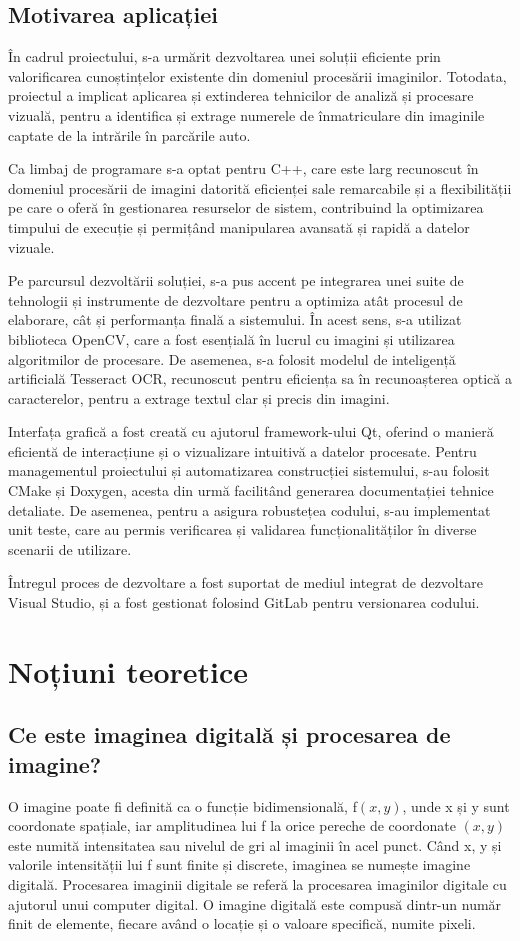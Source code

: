 \documentclass[a4paper,12pt]{report}
\begin{document}
\section{Motivarea aplicației}
În cadrul proiectului, s-a urmărit dezvoltarea unei soluții eficiente prin valorificarea cunoștințelor existente din domeniul procesării imaginilor. Totodata, proiectul a implicat aplicarea și extinderea tehnicilor de analiză și procesare vizuală, pentru a identifica și extrage numerele de înmatriculare din imaginile captate de la intrările în parcările auto.

Ca limbaj de programare s-a optat pentru C++, care este larg recunoscut în domeniul procesării de imagini datorită eficienței sale remarcabile și a flexibilității pe care o oferă în gestionarea resurselor de sistem, contribuind la optimizarea timpului de execuție și permițând manipularea avansată și rapidă a datelor vizuale.

Pe parcursul dezvoltării soluției, s-a pus accent pe integrarea unei suite de tehnologii și instrumente de dezvoltare pentru a optimiza atât procesul de elaborare, cât și performanța finală a sistemului. În acest sens, s-a utilizat biblioteca OpenCV, care a fost esențială în lucrul cu imagini și utilizarea algoritmilor de procesare. De asemenea, s-a folosit modelul de inteligență artificială Tesseract OCR, recunoscut pentru eficiența sa în recunoașterea optică a caracterelor, pentru a extrage textul clar și precis din imagini.

Interfața grafică a fost creată cu ajutorul framework-ului Qt, oferind o manieră eficientă de interacțiune și o vizualizare intuitivă a datelor procesate. Pentru managementul proiectului și automatizarea construcției sistemului, s-au folosit CMake și Doxygen, acesta din urmă facilitând generarea documentației tehnice detaliate. De asemenea, pentru a asigura robustețea codului, s-au implementat unit teste, care au permis verificarea și validarea funcționalităților în diverse scenarii de utilizare.

Întregul proces de dezvoltare a fost suportat de mediul integrat de dezvoltare Visual Studio, și a fost gestionat folosind GitLab pentru versionarea codului.

\chapter{Noțiuni teoretice}
\section{Ce este imaginea digitală și procesarea de imagine?}
O imagine poate fi definită ca o funcție bidimensională, f$(x,y)$, unde x și y sunt coordonate spațiale, iar amplitudinea lui f la orice pereche de coordonate $(x, y)$ este numită intensitatea sau nivelul de gri al imaginii în acel punct. Când x, y și valorile intensității lui f sunt finite și discrete, imaginea se numește imagine digitală. Procesarea imaginii digitale se referă la procesarea imaginilor digitale cu ajutorul unui computer digital. O imagine digitală este compusă dintr-un număr finit de elemente, fiecare având o locație și o valoare specifică, numite pixeli.
\end{document}
